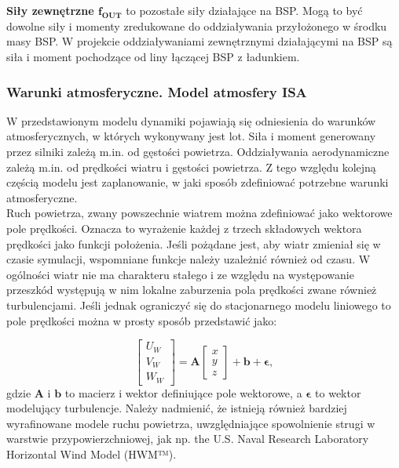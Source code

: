 \textbf{Siły zewnętrzne $\bm{f_{OUT}}$} to pozostałe siły działające na BSP. Mogą to być dowolne siły i momenty zredukowane do oddziaływania przyłożonego w środku masy BSP. W projekcie oddziaływaniami zewnętrznymi działającymi na BSP są siła i moment pochodzące od liny łączącej BSP z ładunkiem.

\subsubsection{Warunki atmosferyczne. Model atmosfery ISA}

W przedstawionym modelu dynamiki pojawiają się odniesienia do warunków atmosferycznych, w których wykonywany jest lot. Siła i moment generowany przez silniki zależą m.in. od gęstości powietrza. Oddziaływania aerodynamiczne zależą m.in. od prędkości wiatru i gęstości powietrza. Z tego względu kolejną częścią modelu jest zaplanowanie, w jaki sposób zdefiniować potrzebne warunki atmosferyczne.\\

Ruch powietrza, zwany powszechnie wiatrem można zdefiniować jako wektorowe pole prędkości. Oznacza to wyrażenie każdej z trzech składowych wektora prędkości jako funkcji położenia. Jeśli pożądane jest, aby wiatr zmieniał się w czasie symulacji, wspomniane funkcje należy uzależnić również od czasu. W ogólności wiatr nie ma charakteru stałego i ze względu na występowanie przeszkód występują w nim lokalne zaburzenia pola prędkości zwane również turbulencjami. Jeśli jednak ograniczyć się do stacjonarnego modelu liniowego to pole prędkości można w prosty sposób przedstawić jako:

\[
	\begin{bmatrix} U_W \\ V_W \\ W_W\end{bmatrix} = \bm{A} \begin{bmatrix} x \\ y \\ z\end{bmatrix}  + \bm{b} + \bm{\epsilon},
\]
gdzie $\bm{A}$ i $\bm{b}$ to macierz i wektor definiujące pole wektorowe, a $\bm{\epsilon}$ to wektor modelujący turbulencje. Należy nadmienić, że istnieją również bardziej wyrafinowane modele ruchu powietrza, uwzględniające spowolnienie strugi w warstwie przypowierzchniowej, jak np. the U.S. Naval Research Laboratory Horizontal Wind Model (HWM™).

